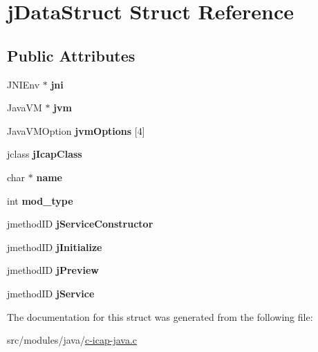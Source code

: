 \hypertarget{structj_data_struct}{\section{j\+Data\+Struct Struct Reference}
\label{structj_data_struct}
}
\subsection*{Public Attributes}
\begin{DoxyCompactItemize}
\item 
\hypertarget{structj_data_struct_adf3537803f59289e98066056657cabac}{J\+N\+I\+Env $\ast$ {\bfseries jni}}\label{structj_data_struct_adf3537803f59289e98066056657cabac}

\item 
\hypertarget{structj_data_struct_a26b05a721b1d8d8028a49e4f22f443cc}{Java\+V\+M $\ast$ {\bfseries jvm}}\label{structj_data_struct_a26b05a721b1d8d8028a49e4f22f443cc}

\item 
\hypertarget{structj_data_struct_a5cb77c99be2288cba0e702ceae53a3e7}{Java\+V\+M\+Option {\bfseries jvm\+Options} \mbox{[}4\mbox{]}}\label{structj_data_struct_a5cb77c99be2288cba0e702ceae53a3e7}

\item 
\hypertarget{structj_data_struct_afe2e8b0e46c91cfa4066a80de5aed985}{jclass {\bfseries j\+Icap\+Class}}\label{structj_data_struct_afe2e8b0e46c91cfa4066a80de5aed985}

\item 
\hypertarget{structj_data_struct_ad48505f43eeafb919a219d65743383a3}{char $\ast$ {\bfseries name}}\label{structj_data_struct_ad48505f43eeafb919a219d65743383a3}

\item 
\hypertarget{structj_data_struct_a64018538a69e2d1ac93fed4478c5f2de}{int {\bfseries mod\+\_\+type}}\label{structj_data_struct_a64018538a69e2d1ac93fed4478c5f2de}

\item 
\hypertarget{structj_data_struct_a0db1637eab8336c8207a9f8f8d030483}{jmethod\+I\+D {\bfseries j\+Service\+Constructor}}\label{structj_data_struct_a0db1637eab8336c8207a9f8f8d030483}

\item 
\hypertarget{structj_data_struct_ad049998f2130a689fc3646863ddda499}{jmethod\+I\+D {\bfseries j\+Initialize}}\label{structj_data_struct_ad049998f2130a689fc3646863ddda499}

\item 
\hypertarget{structj_data_struct_afd899184438ff1d930db94e367564dc7}{jmethod\+I\+D {\bfseries j\+Preview}}\label{structj_data_struct_afd899184438ff1d930db94e367564dc7}

\item 
\hypertarget{structj_data_struct_ab3144cb5ac4982f368ee11398b9a4aef}{jmethod\+I\+D {\bfseries j\+Service}}\label{structj_data_struct_ab3144cb5ac4982f368ee11398b9a4aef}

\end{DoxyCompactItemize}


The documentation for this struct was generated from the following file\+:\begin{DoxyCompactItemize}
\item 
src/modules/java/\hyperlink{c-icap-java_8c}{c-\/icap-\/java.\+c}\end{DoxyCompactItemize}
